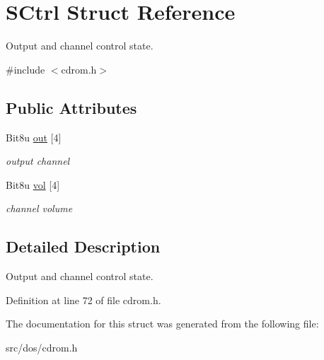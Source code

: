 \hypertarget{structSCtrl}{\section{S\-Ctrl Struct Reference}
\label{structSCtrl}
}


Output and channel control state.  




{\ttfamily \#include $<$cdrom.\-h$>$}

\subsection*{Public Attributes}
\begin{DoxyCompactItemize}
\item 
\hypertarget{structSCtrl_a5b5415593005d9a11a35d11e8bbdd8b3}{Bit8u \hyperlink{structSCtrl_a5b5415593005d9a11a35d11e8bbdd8b3}{out} \mbox{[}4\mbox{]}}\label{structSCtrl_a5b5415593005d9a11a35d11e8bbdd8b3}

\begin{DoxyCompactList}\small\item\em output channel \end{DoxyCompactList}\item 
\hypertarget{structSCtrl_ad029c2b75bd84b09cfe3f893ba6a5004}{Bit8u \hyperlink{structSCtrl_ad029c2b75bd84b09cfe3f893ba6a5004}{vol} \mbox{[}4\mbox{]}}\label{structSCtrl_ad029c2b75bd84b09cfe3f893ba6a5004}

\begin{DoxyCompactList}\small\item\em channel volume \end{DoxyCompactList}\end{DoxyCompactItemize}


\subsection{Detailed Description}
Output and channel control state. 

Definition at line 72 of file cdrom.\-h.



The documentation for this struct was generated from the following file\-:\begin{DoxyCompactItemize}
\item 
src/dos/cdrom.\-h\end{DoxyCompactItemize}
